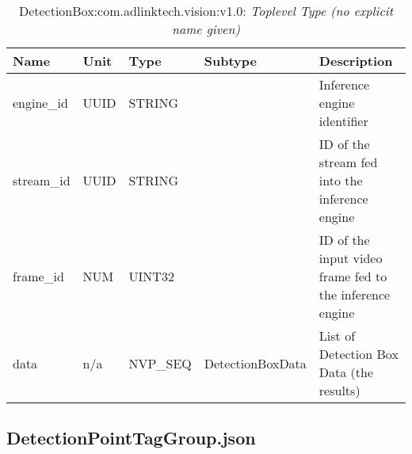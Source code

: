 \begin{table}[H]
\bigskip
\begin{tabularx}{\textwidth}{l l l l X} 
	 \textbf{Name} & \textbf{Unit} & \textbf{Type} & \textbf{Subtype} & \textbf{Description} \\
	 \midrule
   engine\_id & UUID & STRING &  & Inference engine identifier \\
   stream\_id & UUID & STRING &  & ID of the stream fed into the inference engine \\
   frame\_id & NUM & UINT32 &  & ID of the input video frame fed to the inference engine \\
   data & n/a & NVP\_SEQ & DetectionBoxData & List of Detection Box Data (the results) \\
\end{tabularx}
\caption{DetectionBox:com.adlinktech.vision:v1.0: \textit{Toplevel Type (no explicit name given)}}\label{DetectionBoxTagGroup.json:table:DetectionBox-no-type-given}


\end{table}

\subsection{DetectionPointTagGroup.json}

